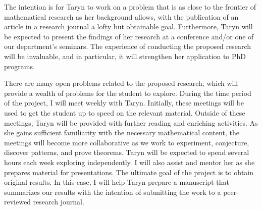 \documentclass[11pt]{article}
\theoremstyle{definition}
\theoremstyle{remark}
\newcommand{\blankline}{\pagebreak[2]\vspace{.5\baselineskip}}
\begin{document}
The intention is for Taryn to work on a problem that is as close to the frontier of mathematical research as her background allows, with the publication of an article in a research journal a lofty but obtainable goal. Furthermore, Taryn will be expected to present the findings of her research at a conference and/or one of our department's seminars. The experience of conducting the proposed research will be invaluable, and in particular, it will strengthen her application to PhD programs.

\blankline
 
There are many open problems related to the proposed research, which will provide a wealth of problems for the student to explore.  During the time period of the project, I will meet weekly with Taryn. Initially, these meetings will be used to get the student up to speed on the relevant material. Outside of these meetings, Taryn will be provided with further reading and enriching activities. As she gains sufficient familiarity with the necessary mathematical content, the meetings will become more collaborative as we work to experiment, conjecture, discover patterns, and prove theorems. Taryn will be expected to spend several hours each week exploring independently. I will also assist and mentor her as she prepares material for presentations. The ultimate goal of the project is to obtain original results. In this case, I will help Taryn prepare a manuscript that summarizes our results with the intention of submitting the work to a peer-reviewed research journal.
\end{document}
